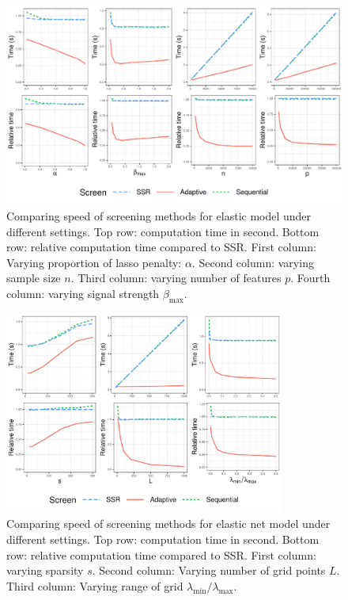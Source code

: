 \begin{figure}[ht]
    \centering
    \includegraphics[width=\textwidth]{enet1.pdf}    \caption{Comparing speed of screening methods for elastic model under different settings. Top row: computation time in second. Bottom row: relative computation time compared to SSR. First column: Varying proportion of lasso penalty: $\alpha$. Second column: varying sample size $n$. Third column: varying number of features $p$. Fourth column: varying signal strength $\beta_{\max}$.}
    \label{fig:sim1}
\end{figure}

\begin{figure}[ht]
    \centering
    \includegraphics[width=0.82\textwidth]{enet2.pdf}    \caption{Comparing speed of screening methods for elastic net model under different settings. Top row: computation time in second. Bottom row: relative computation time compared to SSR. First column: varying sparsity $s$. Second column: Varying number of grid points $L$. Third column: Varying range of grid $\lambda_{\min}/\lambda_{\max}$.}
    \label{fig:sim2}
\end{figure}

